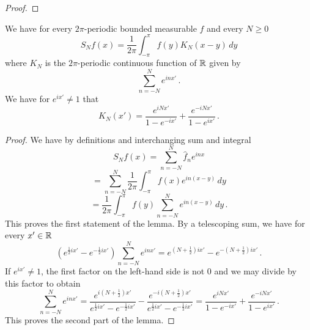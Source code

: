 {\begin{proof}
\end{proof}

\begin{lemma}
\label{dirichlet-kernel}
We have for every $2\pi$-periodic bounded measurable $f$ and every $N\ge 0$
\begin{equation}
    S_Nf(x)=\frac 1{2\pi}\int_{-\pi}^{\pi}f(y) K_N(x-y)\, dy
\end{equation}
where $K_N$ is the $2\pi$-periodic continuous function of
${\mathbb{R}}$ given by
\begin{equation}\label{eqksumexp}
\sum_{n=-N}^N e^{in x'}\, .
\end{equation}
We have for $e^{ix'}\neq 1$ that
\begin{equation}\label{eqksumhil}
    K_N(x')=\frac{e^{iNx'}}{1-e^{-ix'}}
      +\frac {e^{-iNx'}}{1-e^{ix'}} \, .
\end{equation}


\end{lemma}


\begin{proof}
We have by definitions and interchanging sum and integral
   \begin{equation*}
        S_Nf(x)=\sum_{n=-N}^N \widehat{f}_n e^{inx}
    \end{equation*}
       \begin{equation*}
    =\sum_{n=-N}^N \frac 1{2\pi}\int_{-\pi}^{\pi}
    f(x) e^{in(x-y)}\, dy
    \end{equation*}
 \begin{equation}\label{eq-expsum}
     =\frac 1{2\pi}\int_{-\pi}^\pi
    f(y) \sum_{n=-N}^N e^{in(x-y)}\, dy\, .
 \end{equation}
This proves the first statement of the lemma.
By a telescoping sum, we have for every $x'\in {\mathbb{R}}$
\begin{equation}
    \left( e^{\frac 12 ix'}-e^{-\frac 12 ix'}\right)  \sum_{n=-N}^N e^{inx'}= e^{(N+\frac 12) ix'}-e^{-(N+\frac 12) ix'}\, .
\end{equation}
If $e^{ix'}\neq 1$, the first factor on the left-hand side is not $0$ and we may divide by this factor to obtain
\begin{equation}
      \sum_{n=-N}^N e^{inx'}= \frac{e^{i(N+\frac 1 2)x'}}{e^{\frac 12 ix'}-e^{-\frac 12ix'}}
      -\frac{e^{-i(N+\frac 1 2)x'}}{e^{\frac 12 ix'}-e^{-\frac 12ix'}}
       =\frac{e^{iNx'}}{1-e^{-ix'}}
      +\frac {e^{-iNx'}}{1-e^{ix'}}\, .
\end{equation}
This  proves the second part of the lemma.
\end{proof}

}
